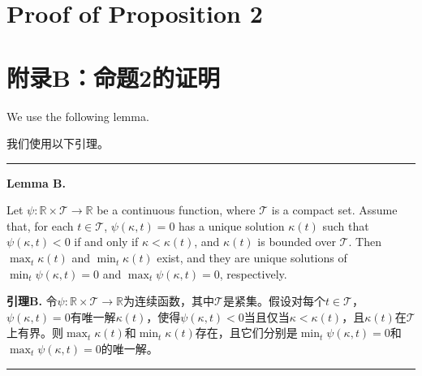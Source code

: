 \documentclass[12pt,a4paper]{article}
\newenvironment{original}
  {\par\medskip\noindent\color{black}\ignorespaces}
  {\par\medskip}
\newenvironment{translation}
  {\par\noindent\color{darkblue}\ignorespaces}
  {\par\medskip\noindent\hrule\par\medskip}
\theoremstyle{definition}
\theoremstyle{remark}
\begin{document}
\section{Proof of Proposition 2}
\section*{\color{darkblue}附录B：命题2的证明}

\begin{original}
We use the following lemma.
\end{original}
\begin{translation}
我们使用以下引理。
\end{translation}

\medskip
\noindent\textbf{Lemma B.}
\begin{original}
Let $\psi \colon \mathbb{R} \times \mathcal{T} \to \mathbb{R}$ be a continuous function, where $\mathcal{T}$ is a compact set. Assume that, for each $t \in \mathcal{T}$, $\psi(\kappa, t) = 0$ has a unique solution $\kappa(t)$ such that $\psi(\kappa, t) < 0$ if and only if $\kappa < \kappa(t)$, and $\kappa(t)$ is bounded over $\mathcal{T}$. Then $\max_t \kappa(t)$ and $\min_t \kappa(t)$ exist, and they are unique solutions of $\min_t \psi(\kappa, t) = 0$ and $\max_t \psi(\kappa, t) = 0$, respectively.
\end{original}
\begin{translation}
\color{darkblue}\textbf{引理B.} 令$\psi \colon \mathbb{R} \times \mathcal{T} \to \mathbb{R}$为连续函数，其中$\mathcal{T}$是紧集。假设对每个$t \in \mathcal{T}$，$\psi(\kappa, t) = 0$有唯一解$\kappa(t)$，使得$\psi(\kappa, t) < 0$当且仅当$\kappa < \kappa(t)$，且$\kappa(t)$在$\mathcal{T}$上有界。则$\max_t \kappa(t)$和$\min_t \kappa(t)$存在，且它们分别是$\min_t \psi(\kappa, t) = 0$和$\max_t \psi(\kappa, t) = 0$的唯一解。
\end{translation}
\end{document}
